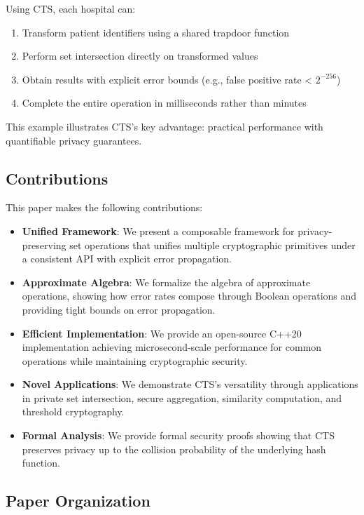 \documentclass[10pt,conference]{IEEEtran}
\begin{document}
Using CTS, each hospital can:
\begin{enumerate}
\item Transform patient identifiers using a shared trapdoor function
\item Perform set intersection directly on transformed values
\item Obtain results with explicit error bounds (e.g., false positive rate < $2^{-256}$)
\item Complete the entire operation in milliseconds rather than minutes
\end{enumerate}

This example illustrates CTS's key advantage: practical performance with quantifiable privacy guarantees.

\subsection{Contributions}

This paper makes the following contributions:

\begin{itemize}
\item \textbf{Unified Framework}: We present a composable framework for privacy-preserving set operations that unifies multiple cryptographic primitives under a consistent API with explicit error propagation.

\item \textbf{Approximate Algebra}: We formalize the algebra of approximate operations, showing how error rates compose through Boolean operations and providing tight bounds on error propagation.

\item \textbf{Efficient Implementation}: We provide an open-source C++20 implementation achieving microsecond-scale performance for common operations while maintaining cryptographic security.

\item \textbf{Novel Applications}: We demonstrate CTS's versatility through applications in private set intersection, secure aggregation, similarity computation, and threshold cryptography.

\item \textbf{Formal Analysis}: We provide formal security proofs showing that CTS preserves privacy up to the collision probability of the underlying hash function.
\end{itemize}

\subsection{Paper Organization}
\end{document}
